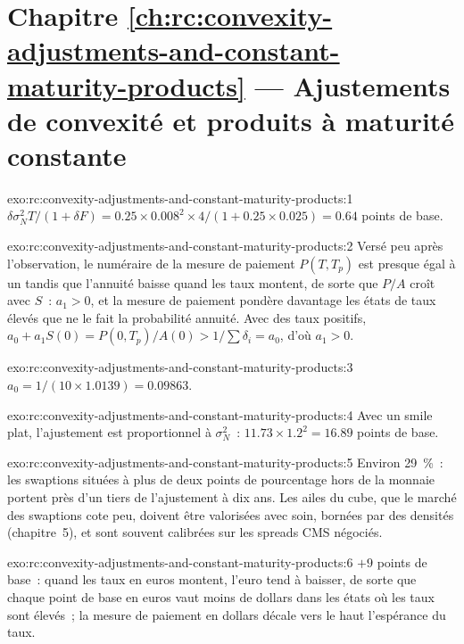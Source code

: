\section*{Chapitre \ref{ch:rc:convexity-adjustments-and-constant-maturity-products} --- Ajustements de convexité et produits à maturité constante}

\begin{solution}{exo:rc:convexity-adjustments-and-constant-maturity-products:1}
$\delta\sigma_N^2T/(1+\delta F) = 0.25\times0.008^2\times4/(1+0.25\times0.025) =
0.64$ points de base.
\end{solution}

\begin{solution}{exo:rc:convexity-adjustments-and-constant-maturity-products:2}
Versé peu après l'observation, le numéraire de la mesure de paiement $P(T,T_p)$ est
presque égal à un tandis que l'annuité baisse quand les taux montent, de sorte que $P/A$ croît avec $S$~:
$a_1>0$, et la mesure de paiement pondère davantage les états de taux élevés que ne le fait
la probabilité annuité. Avec des taux positifs, $a_0 + a_1S(0) = P(0,T_p)/A(0) >
1/\sum\delta_i = a_0$, d'où $a_1 > 0$.
\end{solution}

\begin{solution}{exo:rc:convexity-adjustments-and-constant-maturity-products:3}
$a_0 = 1/(10\times1.0139) = 0.09863$.
\end{solution}

\begin{solution}{exo:rc:convexity-adjustments-and-constant-maturity-products:4}
Avec un smile plat, l'ajustement est proportionnel à $\sigma_N^2$~:
$11.73\times1.2^2 = 16.89$ points de base.
\end{solution}

\begin{solution}{exo:rc:convexity-adjustments-and-constant-maturity-products:5}
Environ 29~\%~: les swaptions situées à plus de deux points de pourcentage hors de la monnaie portent
près d'un tiers de l'ajustement à dix ans. Les ailes du cube, que le marché des swaptions
cote peu, doivent être valorisées avec soin, bornées par des densités
(chapitre~5), et sont souvent calibrées sur les spreads CMS négociés.
\end{solution}

\begin{solution}{exo:rc:convexity-adjustments-and-constant-maturity-products:6}
$+9$ points de base~: quand les taux en euros montent, l'euro tend à baisser, de sorte que chaque
point de base en euros vaut moins de dollars dans les états où les taux sont élevés~; la mesure
de paiement en dollars décale vers le haut l'espérance du taux.
\end{solution}

